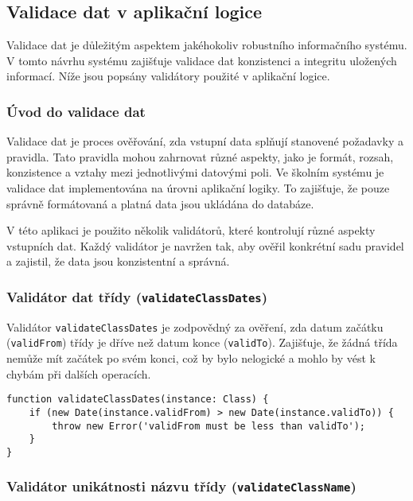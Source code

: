 \subsection{Validace dat v aplikační logice}

Validace dat je důležitým aspektem jakéhokoliv robustního informačního systému. V tomto návrhu  systému zajišťuje validace dat konzistenci a integritu uložených informací. Níže jsou popsány validátory použité v aplikační logice.

\subsubsection*{Úvod do validace dat}

Validace dat je proces ověřování, zda vstupní data splňují stanovené požadavky a pravidla. Tato pravidla mohou zahrnovat různé aspekty, jako je formát, rozsah, konzistence a vztahy mezi jednotlivými datovými poli. Ve školním systému je validace dat implementována na úrovni aplikační logiky. To zajišťuje, že pouze správně formátovaná a platná data jsou ukládána do databáze.

V této aplikaci je použito několik validátorů, které kontrolují různé aspekty vstupních dat. Každý validátor je navržen tak, aby ověřil konkrétní sadu pravidel a zajistil, že data jsou konzistentní a správná.

\subsubsection*{Validátor dat třídy (\texttt{validateClassDates})}

Validátor \texttt{validateClassDates} je zodpovědný za ověření, zda datum začátku (\texttt{validFrom}) třídy je dříve než datum konce (\texttt{validTo}). Zajišťuje, že žádná třída nemůže mít začátek po svém konci, což by bylo nelogické a mohlo by vést k chybám při dalších operacích.

\begin{lstlisting}[title=Kód validátoru dat třídy]
function validateClassDates(instance: Class) {
    if (new Date(instance.validFrom) > new Date(instance.validTo)) {
        throw new Error('validFrom must be less than validTo');
    }
}
\end{lstlisting}

\subsubsection*{Validátor unikátnosti názvu třídy (\texttt{validateClassName})}

